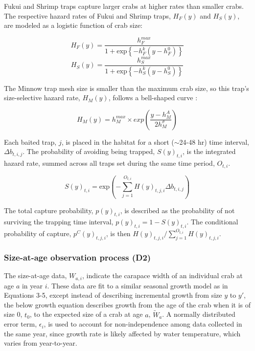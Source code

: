 \documentclass{article}
\begin{document}
Fukui and Shrimp traps capture larger crabs at higher rates than smaller crabs. The respective hazard rates of Fukui and Shrimp traps, $H_F(y)$ and $H_S(y)$, are modeled as a logistic function of crab size:

\begin{equation}
H_F(y) = \frac{h^{max}_F}{1+\text{exp}\left\{-h^k_F(y-h^0_F)\right\}}
\end{equation}
\begin{equation}
H_S(y) = \frac{h^{max}_S}{1+\text{exp}\left\{-h^k_S(y-h^0_S)\right\}}
\end{equation}

The Minnow trap mesh size is smaller than the maximum crab size, so this trap's size-selective hazard rate, $H_M(y)$, follows a bell-shaped curve \parencite{jorgensen2009size}:

\begin{equation}
H_M(y) = h^{max}_M \times exp(\frac{y-h^{A}_M}{2 h^{\sigma}_M})
\end{equation}

Each baited trap, $j$, is placed in the habitat for a short ($\sim$24-48 hr) time interval, $\Delta b_{t,i,j}$. The probability of avoiding being trapped, $S(y)_{t,i}$, is the integrated hazard rate, summed across all traps set during the same time period, $O_{t,i}$.

\begin{equation}
S(y)_{t,i} = \text{exp}\left(-\sum_{j=1}^{O_{t,i}} H(y)_{t,j,i}\Delta b_{t,i,j}\right)
\end{equation}

The total capture probability, $p(y)_{t,i}$, is described as the probability of not surviving the trapping time interval, $p(y)_{t,i} = 1-S(y)_{t,i}$. The conditional probability of capture, $p^C(y)_{t,j,i}$, is then $H(y)_{t,j,i}/\sum_{j=1}^{O_{t,i}}H(y)_{t,j,i}$.

\subsubsection*{Size-at-age observation process (D2)}

The size-at-age data, $W_{a,i}$, indicate the carapace width of an individual crab at age $a$ in year $i$. These data are fit to a similar seasonal growth model as in Equations 3-5, except instead of describing incremental growth from size $y$ to $y'$, the below growth equation describes growth from the age of the crab when it is of size 0, $t_0$, to the expected size of a crab at age $a$, $\widetilde{W}_{a}$. A normally distributed error term, $\epsilon_i$, is used to account for non-independence among data collected in the same year, since growth rate is likely affected by water temperature, which varies from year-to-year.
\end{document}
